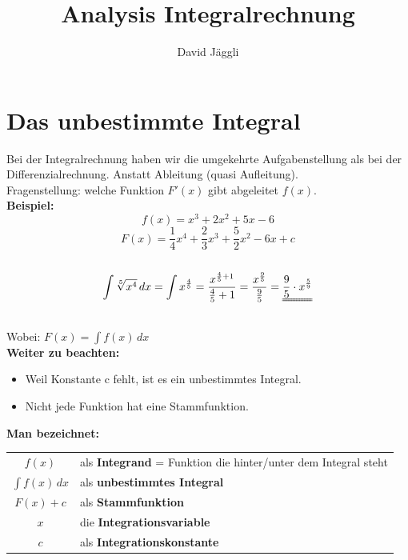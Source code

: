 \documentclass[12pt]{scrartcl}
\author{David Jäggli}
\title{Analysis Integralrechnung}
\begin{document}
\maketitle

\tableofcontents

\newpage
\section{Das unbestimmte Integral}
Bei der Integralrechnung haben wir die umgekehrte Aufgabenstellung als bei der Differenzialrechnung.
Anstatt Ableitung (quasi Aufleitung).\\
Fragenstellung: welche Funktion $F'(x)$ gibt abgeleitet $f(x)$.\\
\textbf{Beispiel:}\\
\[f(x) = x^3+2x^2+5x-6 \]
\[F(x) = \frac{1}{4}x^4+\frac{2}{3}x^3+\frac{5}{2}x^2-6x+c\] \\
\[ \int \sqrt[5]{x^4} \, dx = \int x^{\frac{4}{5}} = \frac{x^{\frac{4}{5} + 1}}{\frac{4}{5} + 1} = \frac{x^{\frac{9}{5}}}{\frac{9}{5}} = \uuline{\frac{9}{5} \cdot x^{\frac{5}{9}}}\]
\\
Wobei: $F(x) = \int f(x) \,dx$ \\

\noindent
\textbf{Weiter zu beachten:}
\begin{itemize}
    \item Weil Konstante c fehlt, ist es ein unbestimmtes Integral.
    \item Nicht jede Funktion hat eine Stammfunktion.
\end{itemize}


\renewcommand{\arraystretch}{1.5}
\begin{tcolorbox}
    \textbf{Man bezeichnet:}\\
    \begin{tabular}{cl}
        $f(x)$            & als \textbf{Integrand} = Funktion die hinter/unter dem Integral steht\\
        $\int f(x) \, dx$ & als \textbf{unbestimmtes Integral} \\
        $F(x) + c$        & als \textbf{Stammfunktion} \\
        $x$               & die \textbf{Integrationsvariable} \\
        $c$               & als \textbf{Integrationskonstante} \\
    \end{tabular}
\end{tcolorbox}
\end{document}
